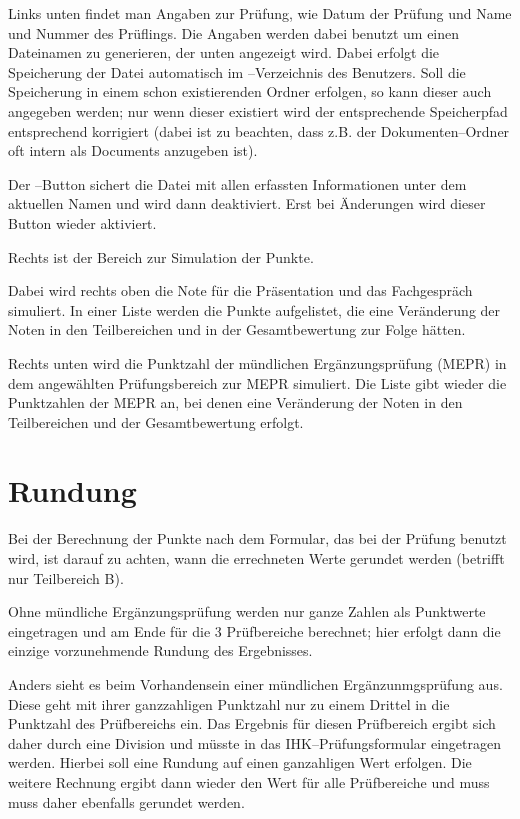 \documentclass[a4paper,notitlepage,parskip=half]{scrartcl}
\begin{document}
Links unten findet man Angaben zur Prüfung, wie Datum der Prüfung und Name und Nummer des Prüflings.
Die Angaben werden dabei benutzt um einen Dateinamen zu generieren, der unten angezeigt wird. Dabei erfolgt die Speicherung der Datei automatisch im --Verzeichnis des Benutzers.
Soll die Speicherung in einem schon existierenden Ordner erfolgen, so kann dieser auch angegeben werden; nur wenn dieser existiert wird der entsprechende Speicherpfad entsprechend korrigiert (dabei ist zu beachten, dass z.B. der Dokumenten--Ordner oft intern als Documents anzugeben ist).

Der --Button sichert die Datei mit allen erfassten Informationen unter dem aktuellen Namen und wird dann deaktiviert. Erst bei Änderungen wird dieser Button wieder aktiviert.

Rechts ist der Bereich zur Simulation der Punkte. 

Dabei wird rechts oben die Note für die Präsentation und das Fachgespräch simuliert. In einer Liste werden die Punkte aufgelistet, die eine Veränderung der Noten in den Teilbereichen und in der Gesamtbewertung zur Folge hätten.

Rechts unten wird die Punktzahl der mündlichen Ergänzungsprüfung (MEPR) in dem angewählten Prüfungsbereich zur MEPR simuliert. Die Liste gibt wieder die Punktzahlen der MEPR an, bei denen eine Veränderung der Noten in den Teilbereichen und der Gesamtbewertung erfolgt. 

\section{Rundung}
Bei der Berechnung der Punkte nach dem Formular, das bei der Prüfung benutzt wird, ist darauf zu achten, wann die errechneten Werte gerundet werden (betrifft nur Teilbereich B).

Ohne mündliche Ergänzungsprüfung werden nur ganze Zahlen als Punktwerte eingetragen und am Ende für die 3 Prüfbereiche berechnet;
hier erfolgt dann die einzige vorzunehmende Rundung des Ergebnisses.

Anders sieht es beim Vorhandensein einer mündlichen Ergänzunmgsprüfung aus. Diese geht mit ihrer ganzzahligen Punktzahl nur zu einem Drittel in die Punktzahl des Prüfbereichs ein. Das Ergebnis für diesen Prüfbereich ergibt sich daher durch eine Division und müsste
in das IHK--Prüfungsformular eingetragen werden. Hierbei soll eine Rundung auf einen ganzahligen Wert erfolgen. Die weitere Rechnung ergibt dann wieder den Wert für alle Prüfbereiche und muss muss daher ebenfalls gerundet werden.
\end{document}
